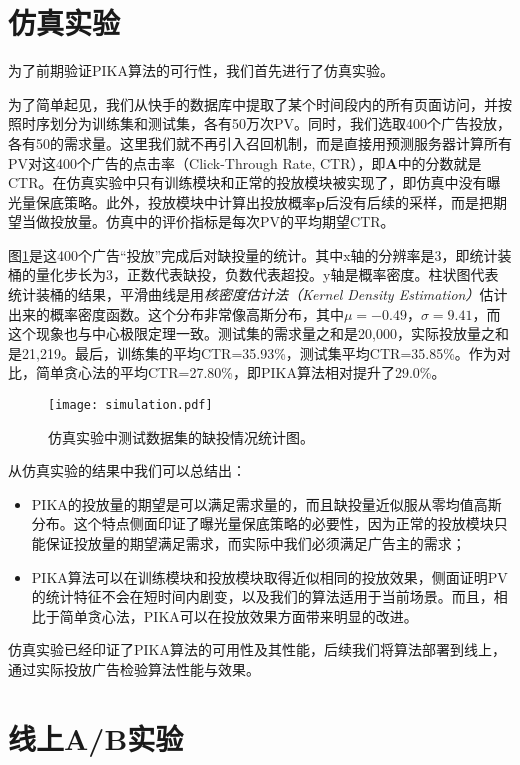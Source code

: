 \section{仿真实验}

为了前期验证PIKA算法的可行性，我们首先进行了仿真实验。

为了简单起见，我们从快手的数据库中提取了某个时间段内的所有页面访问，并按照时序划分为训练集和测试集，各有50万次PV。同时，我们选取400个广告投放，各有50的需求量。这里我们就不再引入召回机制，而是直接用预测服务器计算所有PV对这400个广告的点击率（Click-Through Rate, CTR），即$\bm{A}$中的分数就是CTR。在仿真实验中只有训练模块和正常的投放模块被实现了，即仿真中没有曝光量保底策略。此外，投放模块中计算出投放概率$\bm{p}$后没有后续的采样，而是把期望当做投放量。仿真中的评价指标是每次PV的平均期望CTR。

图\ref{fig:delivery}是这400个广告“投放”完成后对缺投量的统计。其中x轴的分辨率是3，即统计装桶的量化步长为3，正数代表缺投，负数代表超投。y轴是概率密度。柱状图代表统计装桶的结果，平滑曲线是用\textit{核密度估计法（Kernel Density Estimation）}估计出来的概率密度函数。这个分布非常像高斯分布，其中$\mu = -0.49$，$\sigma = 9.41$，而这个现象也与中心极限定理一致。测试集的需求量之和是20,000，实际投放量之和是21,219。最后，训练集的平均CTR=35.93\%，测试集平均CTR=35.85\%。作为对比，简单贪心法的平均CTR=27.80\%，即PIKA算法相对提升了29.0\%。

\begin{figure}[htb]
	\centering
	\texttt{[image: simulation.pdf]}
	\caption{仿真实验中测试数据集的缺投情况统计图。}
	\label{fig:delivery}
\end{figure}

从仿真实验的结果中我们可以总结出：
\begin{itemize}
	\item PIKA的投放量的期望是可以满足需求量的，而且缺投量近似服从零均值高斯分布。这个特点侧面印证了曝光量保底策略的必要性，因为正常的投放模块只能保证投放量的期望满足需求，而实际中我们必须满足广告主的需求；
	\item PIKA算法可以在训练模块和投放模块取得近似相同的投放效果，侧面证明PV的统计特征不会在短时间内剧变，以及我们的算法适用于当前场景。而且，相比于简单贪心法，PIKA可以在投放效果方面带来明显的改进。
\end{itemize}

仿真实验已经印证了PIKA算法的可用性及其性能，后续我们将算法部署到线上，通过实际投放广告检验算法性能与效果。

\section{线上A/B实验}

